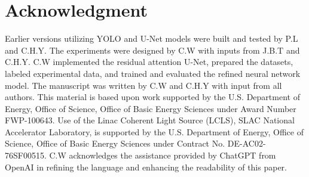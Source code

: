 \documentclass[a4paper]{article}
\begin{document}
\section*{Acknowledgment}

Earlier versions utilizing YOLO and U-Net models were built and tested by P.L and C.H.Y.  The experiments were designed by C.W with inputs from J.B.T and C.H.Y.  C.W implemented the residual attention U-Net, prepared the datasets, labeled experimental data, and trained and evaluated the refined neural network model.  The manuscript was written by C.W and C.H.Y with input from all authors.  This material is based upon work supported by the U.S.  Department of Energy, Office of Science, Office of Basic Energy Sciences under Award Number FWP-100643.  Use of the Linac Coherent Light Source (LCLS), SLAC National Accelerator Laboratory, is supported by the U.S.  Department of Energy, Office of Science, Office of Basic Energy Sciences under Contract No.  DE-AC02-76SF00515.  C.W acknowledges the assistance provided by ChatGPT from OpenAI in refining the language and enhancing the readability of this paper.
\end{document}
